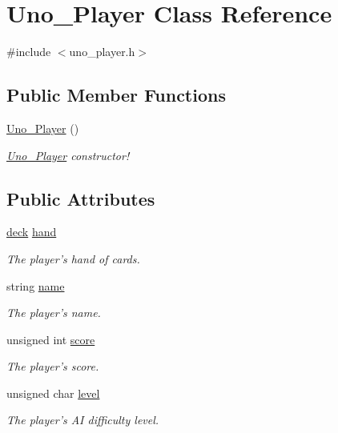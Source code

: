 \hypertarget{class_uno___player}{
\section{\-Uno\-\_\-\-Player \-Class \-Reference}
\label{class_uno___player}
}


{\ttfamily \#include $<$uno\-\_\-player.\-h$>$}

\subsection*{\-Public \-Member \-Functions}
\begin{DoxyCompactItemize}
\item 
\hypertarget{class_uno___player_a0447ff92b80be8d98d0052d7d2a868d7}{
\hyperlink{class_uno___player_a0447ff92b80be8d98d0052d7d2a868d7}{\-Uno\-\_\-\-Player} ()}
\label{class_uno___player_a0447ff92b80be8d98d0052d7d2a868d7}

\begin{DoxyCompactList}\small\item\em \hyperlink{class_uno___player}{\-Uno\-\_\-\-Player} constructor! \end{DoxyCompactList}\end{DoxyCompactItemize}
\subsection*{\-Public \-Attributes}
\begin{DoxyCompactItemize}
\item 
\hyperlink{uno__deck_8h_ab634a15f4d19d3af113a71241b79c408}{deck} \hyperlink{class_uno___player_a210acf259dc060d31139866fdaa91e98}{hand}
\begin{DoxyCompactList}\small\item\em \-The player's hand of cards. \end{DoxyCompactList}\item 
string \hyperlink{class_uno___player_aae7371d13b426d5da6a290ab00590a17}{name}
\begin{DoxyCompactList}\small\item\em \-The player's name. \end{DoxyCompactList}\item 
unsigned int \hyperlink{class_uno___player_ad890e9b411f90bd5be34fffd9704f122}{score}
\begin{DoxyCompactList}\small\item\em \-The player's score. \end{DoxyCompactList}\item 
unsigned char \hyperlink{class_uno___player_acac0c2dc34e3ab51edc7525ca70b8bfb}{level}
\begin{DoxyCompactList}\small\item\em \-The player's \-A\-I difficulty level. \end{DoxyCompactList}\end{DoxyCompactItemize}


